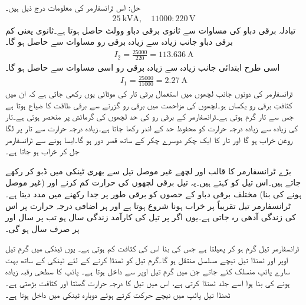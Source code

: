 حل:	اس ٹرانسفارمر کی معلومات درج ذیل ہیں۔
\begin{align*}
\SI{25}{\kilo \volt \ampere}, \quad 11000:220\,\si{\volt}
\end{align*}
تبادلہ برقی دباو کی مساوات سے  ثانوی  برقی دباو    وولٹ حاصل ہوتا ہے۔ثانوی  یعنی کم برقی دباو  جانب زیادہ سے زیادہ برقی رو مساوات   سے حاصل ہو گا۔
\begin{align*}
I_2=\frac{25000}{220}=\SI{113.636}{\ampere}
\end{align*}
اسی طرح  ابتدائی جانب زیادہ سے زیادہ برقی رو اسی مساوات سے حاصل ہو گا۔
\begin{align*}
I_1=\frac{25000}{11000}=\SI{2.27}{\ampere}
\end{align*}
%
ٹرانسفارمر کی دونوں جانب لچھوں میں استعمال برقی تار کی موٹائی یوں رکھی جاتی ہے کہ ان میں کثافتِ برقی رو  یکساں ہو۔لچھوں کی مزاحمت میں برقی رو گزرنے سے برقی طاقت کا ضیاع ہوتا ہے جس سے تار گرم ہوتی ہے۔ٹرانسفارمر کے برقی رو کی حد لچھوں کی گرمائش پر منحصر ہوتی ہے۔تار کی زیادہ سے زیادہ درجہ حرارت کو محفوظ حد کے اندر رکھا جاتا ہے۔زیادہ درجہ حرارت سے تار پر لگا روغن خراب ہو گا اور تار کا ایک چکر دوسرے چکر کے ساتھ قصر دور ہو گا۔ایسا ہونے سے ٹرانسفارمر جل کر خراب ہو جاتا ہے۔ 

بڑے ٹرانسفارمر کا قالب اور لچھے  غیر موصل تیل سے بھری ٹینکی میں ڈبو کر رکھے جاتے ہیں۔اس تیل کو  کہتے ہیں۔یہ تیل برقی لچھوں کی حرارت کم کرنے  اور   (غیر موصل ہونے کی بنا) مختلف برقی دباو کے حصوں کو برقی طور پر جدا رکھنے میں مدد دیتا ہے۔ٹرانسفارمر تیل تقریباً   پر خراب ہونا شروع ہوتا ہے اور ہر  اضافی درجہ حرارت پر اس کی زندگی آدھی رہ جاتی ہے۔یوں اگر  پر تیل کی کارآمد زندگی  سال ہو تب  پر  سال اور   پر  صرف   سال ہو گی۔

ٹرانسفارمر  تیل گرم ہو کر پھیلتا ہے جس کی بنا اس کی کثافت کم ہوتی ہے۔ یوں  ٹینکی میں گرم تیل اوپر اور ٹھنڈا تیل نیچے مسلسل منتقل ہو گا۔گرم تیل کو ٹھنڈا کرنے کے لئے ٹینکی کے ساتھ بہت سارے پائپ منسلک کئے جاتے جن میں  گرم تیل  اوپر سے  داخل ہوتا ہے۔ پائپ کا سطحی رقبہ زیادہ ہونے کی بنا ہوا اسے جلد ٹھنڈا کرتی ہے،  اس میں تیل کا درجہ حرارت گھٹتا اور  کثافت بڑھتی ہے۔ٹھنڈا تیل پائپ میں نیچے حرکت کرتے ہوئے دوبارہ ٹینکی میں داخل ہوتا ہے۔

